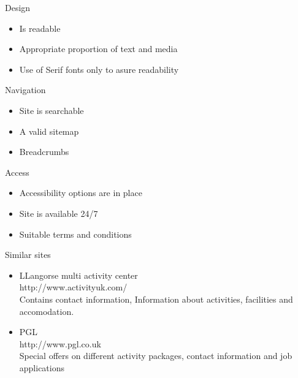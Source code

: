 \documentclass{article}
\begin{document}
Design
\begin{itemize}
\item Is readable
\item Appropriate proportion of text and media
\item Use of Serif fonts only to asure readability
\end{itemize}

Navigation
\begin{itemize}
\item Site is searchable
\item A valid sitemap
\item Breadcrumbs
\end{itemize}

Access
\begin{itemize}
\item Accessibility options are in place
\item Site is available 24/7
\item Suitable terms and conditions
\end{itemize}

Similar sites

\begin{itemize}
\item LLangorse multi activity center
\\http://www.activityuk.com/
\\Contains contact information, Information about activities, facilities and accomodation.
\item PGL
\\http://www.pgl.co.uk
\\Special offers on different activity packages, contact information and job applications
\end{itemize}

\end{document}
